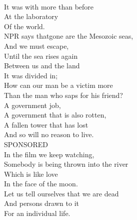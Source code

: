 \documentclass[smalldemyvopaper,11pt,twoside,onecolumn,openright,extrafontsizes]{memoir}
\begin{document}
\\It was with more than before
\\At the laboratory
\\Of the world.
\\NPR says thatgone are the Mesozoic seas,
\\And we must escape,
\\Until the sea rises again
\\Between us and the land
\\It was divided in;
\\How can our man be a victim more
\\Than the man who saps for his friend?
\\A government job,
\\A government that is also rotten,
\\A fallen tower that has lost
\\And so will no reason to live.
\\SPONSORED
\\In the film we keep watching,
\\Somebody is being thrown into the river
\\Which is like love
\\In the face of the moon.
\\Let us tell ourselves that we are dead
\\And persons drawn to it
\\For an individual life.
\end{document}
